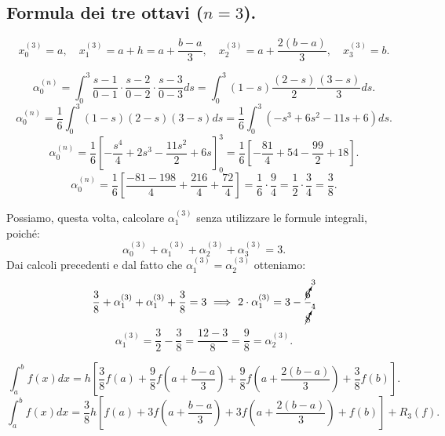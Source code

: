 \subsection{Formula dei tre ottavi ($n=3$).}
\[x_0^{(3)} = a, \quad x_1^{(3)} = a+h = a+ \frac{b-a}{3},
\quad x_2^{(3)} = a+\frac{2(b-a)}{3},\quad x_3^{(3)} = b.\]

\[\alpha_0^{(n)}=
\int_0^3 \frac{s-1}{0-1} \cdot \frac{s-2}{0-2}\cdot \frac{s-3}{0-3}ds =
\int_0^3(1-s)\frac{(2-s)}{2}\frac{(3-s)}{3}ds.
\]
\[\alpha_0^{(n)}=
\frac{1}{6}\int_0^3(1-s)(2-s)(3-s)ds = \frac{1}{6}\int_0^3 \left(
-s^3 +6s^2 -11s +6\right)ds.
\]
\[\alpha_0^{(n)}=
\frac{1}{6}\left[-\frac{s^4}{4} +2s^3 -\frac{11 s^2}{2} +6s\right]_0^3
= \frac{1}{6}\left[-\frac{81}{4}+ 54 -\frac{99}{2} +18 \right].
\]
\[\alpha_0^{(n)}=
\frac{1}{6}\left[\frac{-81-198}{4} +\frac{216}{4} + \frac{72}{4}\right]
= \frac{1}{6} \cdot \frac{9}{4} = \frac{1}{2}\cdot \frac{3}{4} = \frac{3}{8}.
\]

Possiamo, questa volta, calcolare $\alpha_1^{(3)}$ senza utilizzare le formule 
integrali, poiché:
\[
\alpha_0^{(3)} + \alpha_1^{(3)} + \alpha_2^{(3)} + \alpha_3^{(3)} = 3.
\]
Dai calcoli precedenti e dal fatto che $\alpha_1^{(3)} = \alpha_2^{(3)}$ 
otteniamo:
\[
\frac{3}{8} + \alpha_1^{(3)} + \alpha_1^{(3)} + \frac{3}{8} = 3\ 
\Longrightarrow\
2\cdot \alpha_1^{(3)} = 3 - \frac{\cancelto{3}{6}}{\cancelto{4}{8}}.
\]
\[
\alpha_1^{(3)} = \frac{3}{2}-\frac{3}{8} = \frac{12-3}{8} = \frac{9}{8} = 
\alpha_2^{(3)}.
\]

\[
\int_a^bf(x)dx = h\left[\frac{3}{8}f(a) + \frac{9}{8}f\left(a +\frac{b-a}{3}
\right) + \frac{9}{8} f\left(a+\frac{2(b-a)}{3}\right) + \frac{3}{8}f(b)
\right].
\]
\[
\int_a^bf(x)dx = \frac{3}{8} h \left[
f(a) + 3 f\left(a +\frac{b-a}{3}\right) + 3f\left(a+\frac{2(b-a)}{3}\right)
+f(b)\right] + R_3(f).
\]

